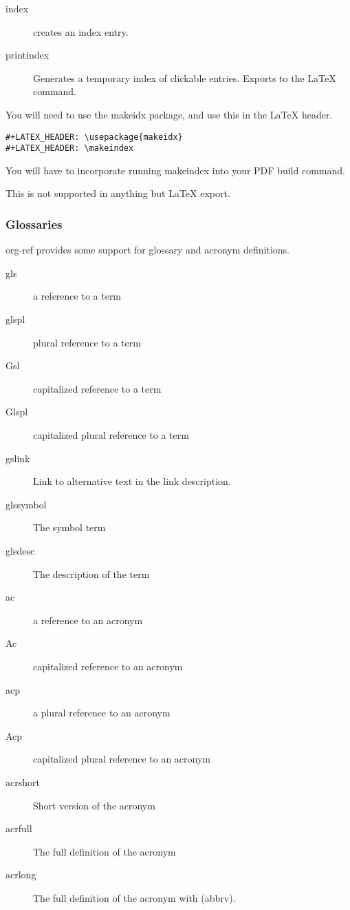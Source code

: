 \documentclass[11pt]{article}
\begin{document}
\begin{description}
\item[{index}] creates an index entry.
\item[{printindex}] Generates a temporary index of clickable entries. Exports to the \LaTeX{} command.
\end{description}

You will need to use the makeidx package, and use this in the \LaTeX{} header.

\begin{verbatim}
#+LATEX_HEADER: \usepackage{makeidx}
#+LATEX_HEADER: \makeindex
\end{verbatim}

You will have to incorporate running makeindex into your PDF build command.

This is not supported in anything but \LaTeX{} export.

\subsubsection{Glossaries}
\label{sec:orgd00750b}

org-ref provides some support for glossary and acronym definitions.
\begin{description}
\item[{gls}] a reference to a term
\item[{glspl}] plural reference to a term
\item[{Gsl}] capitalized reference to a term
\item[{Glspl}] capitalized plural reference to a term
\item[{gslink}] Link to alternative text in the link description.
\item[{glssymbol}] The symbol term
\item[{glsdesc}] The description of the term

\item[{ac}] a reference to an acronym
\item[{Ac}] capitalized reference to an acronym
\item[{acp}] a plural reference to an acronym
\item[{Acp}] capitalized plural reference to an acronym
\item[{acrshort}] Short version of the acronym
\item[{acrfull}] The full definition of the acronym
\item[{acrlong}] The full definition of the acronym with (abbrv).
\end{description}
\end{document}

